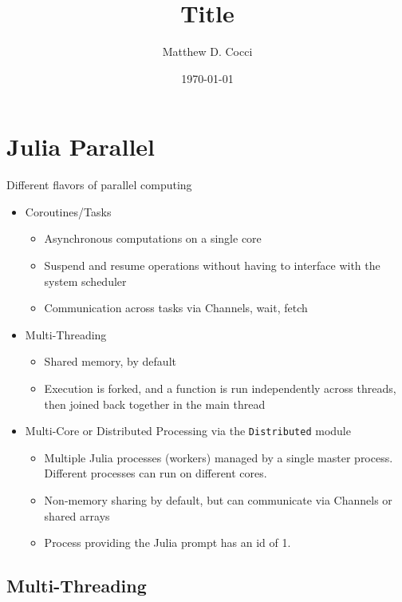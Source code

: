 \documentclass[12pt]{article}
\author{Matthew D. Cocci}
\title{Title}
\date{\today}
\theoremstyle{plain}
\theoremstyle{definition}
\theoremstyle{remark}
\begin{document}
\lstset{style=log}



\clearpage
\section{Julia Parallel}

Different flavors of parallel computing
\begin{itemize}
  \item Coroutines/Tasks
    \begin{itemize}
      \item Asynchronous computations on a single core
      \item Suspend and resume operations without having to interface
        with the system scheduler
      \item Communication across tasks via Channels, wait, fetch
    \end{itemize}
  \item Multi-Threading
    \begin{itemize}
      \item Shared memory, by default
      \item Execution is forked, and a function is run independently
        across threads, then joined back together in the main thread
    \end{itemize}
  \item Multi-Core or Distributed Processing
    via the \texttt{Distributed} module
    \begin{itemize}
      \item Multiple Julia processes (workers) managed by a single
        master process.
        Different processes can run on different cores.
      \item Non-memory sharing by default, but can communicate via
        Channels or shared arrays
      \item Process providing the Julia prompt has an id of 1.
    \end{itemize}
\end{itemize}



\subsection{Multi-Threading}
\end{document}
